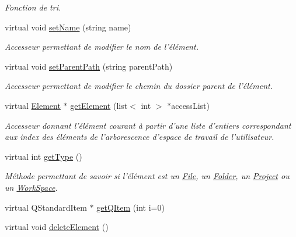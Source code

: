 \begin{DoxyCompactItemize}
\begin{DoxyCompactList}\small\item\em Fonction de tri. \item\end{DoxyCompactList}\item 
virtual void \hyperlink{class_folder_a2c3e281ae41dd82feb354c1456bee923}{setName} (string name)
\begin{DoxyCompactList}\small\item\em Accesseur permettant de modifier le nom de l'élément. \item\end{DoxyCompactList}\item 
virtual void \hyperlink{class_folder_a41839442b7ea5a33f06c2afa7980a974}{setParentPath} (string parentPath)
\begin{DoxyCompactList}\small\item\em Accesseur permettant de modifier le chemin du dossier parent de l'élément. \item\end{DoxyCompactList}\item 
virtual \hyperlink{class_element}{Element} $\ast$ \hyperlink{class_folder_a8912d9c5225d5d9149b6f26cd590a840}{getElement} (list$<$ int $>$ $\ast$accessList)
\begin{DoxyCompactList}\small\item\em Accesseur donnant l'élément courant à partir d'une liste d'entiers correspondant aux index des éléments de l'arborescence d'espace de travail de l'utilisateur. \item\end{DoxyCompactList}\item 
virtual int \hyperlink{class_folder_ac032a805ab49927a9b0a97453a2ae5d5}{getType} ()
\begin{DoxyCompactList}\small\item\em Méthode permettant de savoir si l'élément est un \hyperlink{class_file}{File}, un \hyperlink{class_folder}{Folder}, un \hyperlink{class_project}{Project} ou un \hyperlink{class_work_space}{WorkSpace}. \item\end{DoxyCompactList}\item 
virtual QStandardItem $\ast$ \hyperlink{class_folder_a71c34c87b7e558e833d5ce850a506f97}{getQItem} (int i=0)
\item 
\hypertarget{class_folder_aa59981a88d2556aaf70a7498ae2c9e77}{
virtual void \hyperlink{class_folder_aa59981a88d2556aaf70a7498ae2c9e77}{deleteElement} ()}
\label{class_folder_aa59981a88d2556aaf70a7498ae2c9e77}


\end{DoxyCompactItemize}

